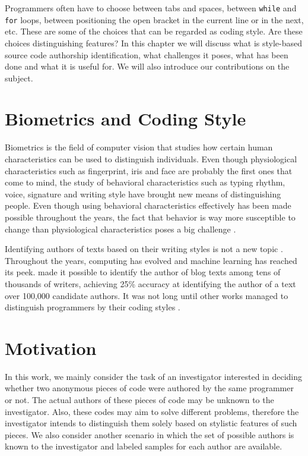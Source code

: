 
Programmers often have to choose between tabs and spaces, between \texttt{while} and \texttt{for} loops, between positioning the open bracket in the current line or in the next, etc. These are some of the choices that can be regarded as coding style. Are these choices distinguishing features? In this chapter we will discuss what is style-based source code authorship identification, what challenges it poses, what has been done and what it is useful for. We will also introduce our contributions on the subject.

\section{Biometrics and Coding Style}

Biometrics is the field of computer vision that studies how certain human characteristics can be used to distinguish individuals. Even though physiological characteristics such as fingerprint, iris and face are probably the first ones that come to mind, the study of behavioral characteristics such as typing rhythm, voice, signature and writing style have brought new means of distinguishing people. Even though using behavioral characteristics effectively has been made possible throughout the years, the fact that behavior is way more susceptible to change than physiological characteristics poses a big challenge \cite{guidebio}.

Identifying authors of texts based on their writing styles is not a new topic \cite{mendenhall}. Throughout the years, computing has evolved and machine learning has reached its peek.  made it possible to identify the author of blog texts among tens of thousands of writers, achieving 25\% accuracy at identifying the author of a text over 100,000 candidate authors. It was not long until other works managed to distinguish programmers by their coding styles \cite{caliskan_2015}.

\section{Motivation}

In this work, we mainly consider the task of an investigator interested in deciding whether two anonymous pieces of code were authored by the same programmer or not. The actual authors of these pieces of code may be unknown to the investigator. Also, these codes may aim to solve different problems, therefore the investigator intends to distinguish them solely based on stylistic features of such pieces. We also consider another scenario in which the set of possible authors is known to the investigator and labeled samples for each author are available.

